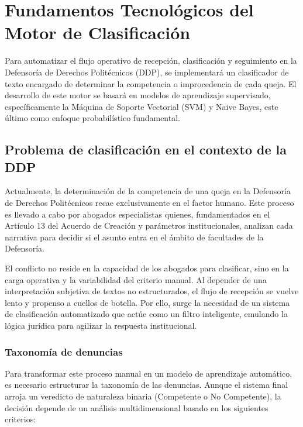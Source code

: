 \chapter{Fundamentos Tecnológicos del Motor de Clasificación}

Para automatizar el flujo operativo de recepción, clasificación y seguimiento en la Defensoría de Derechos Politécnicos (DDP), se implementará un clasificador de texto encargado de determinar la competencia o improcedencia de cada queja. El desarrollo de este motor se basará en modelos de aprendizaje supervisado, específicamente la Máquina de Soporte Vectorial (SVM) y Naive Bayes, este último como enfoque probabilístico fundamental.

\section{Problema de clasificación en el contexto de la DDP}

Actualmente, la determinación de la competencia de una queja en la Defensoría de Derechos Politécnicos recae exclusivamente en el factor humano. Este proceso es llevado a cabo por abogados especialistas quienes, fundamentados en el Artículo 13 del Acuerdo de Creación y parámetros institucionales, analizan cada narrativa para decidir si el asunto entra en el ámbito de facultades de la Defensoría.

El conflicto no reside en la capacidad de los abogados para clasificar, sino en la carga operativa y la variabilidad del criterio manual. Al depender de una interpretación subjetiva de textos no estructurados, el flujo de recepción se vuelve lento y propenso a cuellos de botella. Por ello, surge la necesidad de un sistema de clasificación automatizado que actúe como un filtro inteligente, emulando la lógica jurídica para agilizar la respuesta institucional.

\subsection{Taxonomía de denuncias}
Para transformar este proceso manual en un modelo de aprendizaje automático, es necesario estructurar la taxonomía de las denuncias. Aunque el sistema final arroja un veredicto de naturaleza binaria (Competente o No Competente), la decisión depende de un análisis multidimensional basado en los siguientes criterios:

